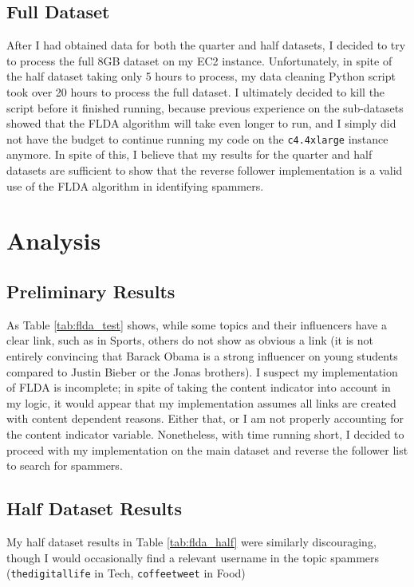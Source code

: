 \documentclass[a4paper]{article}
\begin{document}
\subsection{Full Dataset}
After I had obtained data for both the quarter and half datasets, I decided to try to process the full 8GB dataset on my EC2 instance. Unfortunately, in spite of the half dataset taking only 5 hours to process, my data cleaning Python script took over 20 hours to process the full dataset. I ultimately decided to kill the script before it finished running, because previous experience on the sub-datasets showed that the FLDA algorithm will take even longer to run, and I simply did not have the budget to continue running my code on the \verb+c4.4xlarge+ instance anymore. In spite of this, I believe that my results for the quarter and half datasets are sufficient to show that the reverse follower implementation is a valid use of the FLDA algorithm in identifying spammers.

\section{Analysis}
\label{sec:analysis}
\subsection{Preliminary Results}
As Table \ref{tab:flda_test} shows, while some topics and their influencers have a clear link, such as in Sports, others do not show as obvious a link (it is not entirely convincing that Barack Obama is a strong influencer on young students compared to Justin Bieber or the Jonas brothers). I suspect my implementation of FLDA is incomplete; in spite of taking the content indicator into account in my logic, it would appear that my implementation assumes all links are created with content dependent reasons. Either that, or I am not properly accounting for the content indicator variable. Nonetheless, with time running short, I decided to proceed with my implementation on the main dataset and reverse the follower list to search for spammers.

\subsection{Half Dataset Results}
My half dataset results in Table \ref{tab:flda_half} were similarly discouraging, though I would occasionally find a relevant username in the topic spammers (\verb+thedigitallife+ in Tech, \verb+coffeetweet+ in Food)
\end{document}
